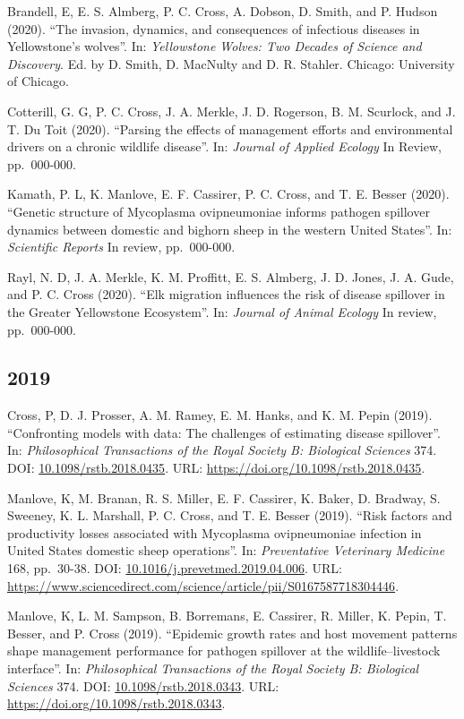 \documentclass[12pt,]{article}
\begin{document}
Brandell, E, E. S. Almberg, P. C. Cross, A. Dobson, D. Smith, and P.
Hudson (2020). ``The invasion, dynamics, and consequences of infectious
diseases in Yellowstone's wolves''. In: \emph{Yellowstone Wolves: Two
Decades of Science and Discovery}. Ed. by D. Smith, D. MacNulty and D.
R. Stahler. Chicago: University of Chicago.

Cotterill, G. G, P. C. Cross, J. A. Merkle, J. D. Rogerson, B. M.
Scurlock, and J. T. Du Toit (2020). ``Parsing the effects of management
efforts and environmental drivers on a chronic wildlife disease''. In:
\emph{Journal of Applied Ecology} In Review, pp.~000-000.

Kamath, P. L, K. Manlove, E. F. Cassirer, P. C. Cross, and T. E. Besser
(2020). ``Genetic structure of Mycoplasma ovipneumoniae informs pathogen
spillover dynamics between domestic and bighorn sheep in the western
United States''. In: \emph{Scientific Reports} In review, pp.~000-000.

Rayl, N. D, J. A. Merkle, K. M. Proffitt, E. S. Almberg, J. D. Jones, J.
A. Gude, and P. C. Cross (2020). ``Elk migration influences the risk of
disease spillover in the Greater Yellowstone Ecosystem''. In:
\emph{Journal of Animal Ecology} In review, pp.~000-000.

\hypertarget{section}{%
\subsection{2019}\label{section}}

Cross, P, D. J. Prosser, A. M. Ramey, E. M. Hanks, and K. M. Pepin
(2019). ``Confronting models with data: The challenges of estimating
disease spillover''. In: \emph{Philosophical Transactions of the Royal
Society B: Biological Sciences} 374. DOI:
\href{https://doi.org/10.1098\%2Frstb.2018.0435}{10.1098/rstb.2018.0435}.
URL: \url{https://doi.org/10.1098/rstb.2018.0435}.

Manlove, K, M. Branan, R. S. Miller, E. F. Cassirer, K. Baker, D.
Bradway, S. Sweeney, K. L. Marshall, P. C. Cross, and T. E. Besser
(2019). ``Risk factors and productivity losses associated with
Mycoplasma ovipneumoniae infection in United States domestic sheep
operations''. In: \emph{Preventative Veterinary Medicine} 168,
pp.~30-38. DOI:
\href{https://doi.org/10.1016\%2Fj.prevetmed.2019.04.006}{10.1016/j.prevetmed.2019.04.006}.
URL:
\url{https://www.sciencedirect.com/science/article/pii/S0167587718304446}.

Manlove, K, L. M. Sampson, B. Borremans, E. Cassirer, R. Miller, K.
Pepin, T. Besser, and P. Cross (2019). ``Epidemic growth rates and host
movement patterns shape management performance for pathogen spillover at
the wildlife--livestock interface''. In: \emph{Philosophical
Transactions of the Royal Society B: Biological Sciences} 374. DOI:
\href{https://doi.org/10.1098\%2Frstb.2018.0343}{10.1098/rstb.2018.0343}.
URL: \url{https://doi.org/10.1098/rstb.2018.0343}.
\end{document}
